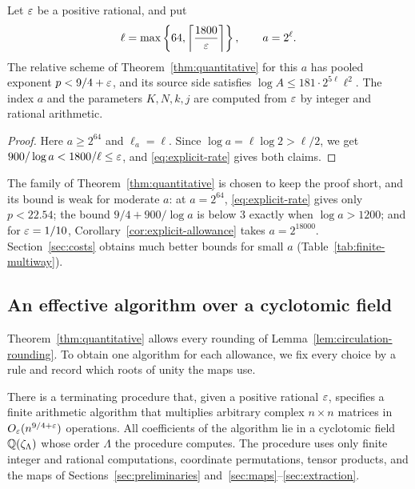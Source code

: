 \begin{corollary}
\label{cor:explicit-allowance}
Let \(\varepsilon\) be a positive rational, and put
\[
 \ell=\max\left\{64,\left\lceil\frac{1800}{\varepsilon}\right\rceil\right\},
 \qquad a=2^\ell.
\]
The relative scheme of Theorem~\ref{thm:quantitative} for this \(a\)
has pooled exponent \(p<9/4+\varepsilon\), and its source side satisfies
\(\log A\le181\cdot2^{5\ell}\ell^2\). The index \(a\) and the
parameters \(K,N,k,j\) are computed from \(\varepsilon\) by integer and
rational arithmetic.
\end{corollary}

\begin{proof}
Here \(a\ge2^{64}\) and \(\ell_a=\ell\). Since
\(\log a=\ell\log2>\ell/2\), we get
\(900/\log a<1800/\ell\le\varepsilon\), and \eqref{eq:explicit-rate} gives
both claims.
\end{proof}

\begin{remark}[Calibration]\label{rem:calibration}
The family of Theorem~\ref{thm:quantitative} is chosen to keep the
proof short, and its bound is weak for moderate \(a\): at \(a=2^{64}\),
\eqref{eq:explicit-rate} gives only \(p<22.54\); the bound
\(9/4+900/\log a\) is below \(3\) exactly when \(\log a>1200\); and for
\(\varepsilon=1/10\), Corollary~\ref{cor:explicit-allowance} takes
\(a=2^{18000}\).
Section~\ref{sec:costs} obtains much better bounds for small \(a\)
(Table~\ref{tab:finite-multiway}).
\end{remark}

\subsection{An effective algorithm over a cyclotomic field}
\label{subsec:effective}

Theorem~\ref{thm:quantitative} allows every rounding of
Lemma~\ref{lem:circulation-rounding}. To obtain one algorithm for each
allowance, we fix every choice by a rule and record which roots of unity
the maps use.

\begin{theorem}\label{thm:effective}
There is a terminating procedure that, given a positive rational
\(\varepsilon\), specifies a finite arithmetic algorithm that multiplies
arbitrary complex \(n\times n\) matrices in \(O_\varepsilon(n^{9/4+\varepsilon})\)
operations. All coefficients of the algorithm lie in a cyclotomic field
\(\mathbb Q(\zeta_\Lambda)\) whose order \(\Lambda\) the procedure computes.
The procedure uses only finite integer and rational computations,
coordinate permutations, tensor products, and the maps of
Sections~\ref{sec:preliminaries} and~\ref{sec:maps}--\ref{sec:extraction}.
\end{theorem}


